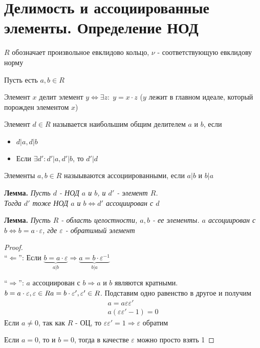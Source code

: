 \section{Делимость и ассоциированные элементы. Определение НОД}
\begin{normalsize}
    $R$ обозначает произвольное евклидово кольцо, $\nu$ - соответствующую евклидову норму
    \begin{theorem-non}
        Пусть есть $a, b \in R$
        \begin{conj}
            Элемент $x$ делит элемент $y \Longleftrightarrow \exists z: \; y = x \cdot z$ ($y$ лежит в главном идеале, который порожден элементом $x$)
        \end{conj}
        \begin{conj}
            Элемент $d \in R$ называется наибольшим общим делителем $a$ и $b$, если \begin{itemize}
                \item $d | a, d | b$
                \item Если $\exists d' : d' | a, d' | b$, то $d' | d$
            \end{itemize}
        \end{conj}
    \end{theorem-non}
        \begin{conj}
            Элементы $a, b \in R$ назыываются ассоциированными, если $a|b$ и $b|a$
        \end{conj}
        \textbf{Лемма.}
        \textit{Пусть $d$ - НОД $a$ и $b$, и $d'$ - элемент $R$. \\
        Тогда $d'$ тоже НОД $a$ и $b \Longleftrightarrow d'$ ассоциирован с $d$}

        \textbf{Лемма.} 
        \textit{
            Пусть $R$ - область целостности, $a, b$ - ее элементы. $a$ ассоциирован с $b \Longleftrightarrow b = a \cdot \varepsilon$, 
            где $\varepsilon$ - обратимый элемент 
        } 
        \begin{proof} \quad \\
            ``$\Longleftarrow$'': Если $\underbrace{b = a \cdot \varepsilon}_{a | b} \Longrightarrow \underbrace{a = b \cdot \varepsilon^{-1}}_{b | a}$ 

            ``$\Longrightarrow$'': $a$ ассоциирован с $b \Longrightarrow a$ и $b$ являются кратными. $b = a \cdot \varepsilon, \varepsilon \in R \\
            a = b \cdot \varepsilon', \varepsilon' \in R$. Подставим одно равенство в другое и получим 
            \begin{gather*}
                a = a\varepsilon\varepsilon' \\
                a(\varepsilon\varepsilon' - 1) = 0
            \end{gather*}
            Если $a \neq 0$, так как $R$ - ОЦ, то $\varepsilon\varepsilon' = 1 \Longrightarrow \varepsilon$ обратим 
            
            Если $a = 0$, то и $b = 0$, тогда в качестве $\varepsilon$ можно просто взять 1
        \end{proof}
\end{normalsize}
